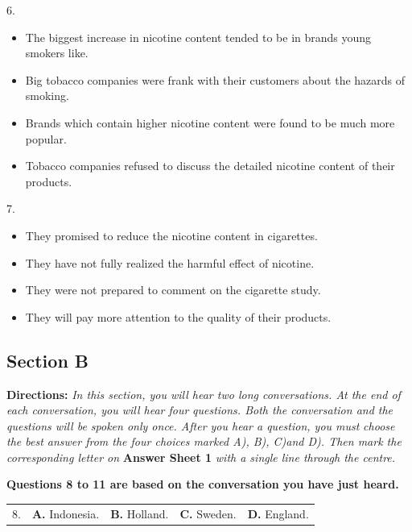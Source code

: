 \documentclass[UTF8,11pt]{ctexart}
\begin{document}
6.


\begin{itemize}[leftmargin=2em,itemsep=.2em,topsep=.4em]\item[A.] The biggest increase in nicotine content tended to be in brands young smokers like.
\item[B.] Big tobacco companies were frank with their customers about the hazards of smoking.
\item[C.] Brands which contain higher nicotine content were found to be much more popular.
\item[D.] Tobacco companies refused to discuss the detailed nicotine content of their products.
\end{itemize}

7.


\begin{itemize}[leftmargin=2em,itemsep=.2em,topsep=.4em]\item[A.] They promised to reduce the nicotine content in cigarettes.
\item[B.] They have not fully realized the harmful effect of nicotine.
\item[C.] They were not prepared to comment on the cigarette study.
\end{itemize}

\begin{itemize}[leftmargin=2em,itemsep=.2em,topsep=.4em]\item[D.] They will pay more attention to the quality of their products.
\end{itemize}

\subsection*{\textbf{Section B}}


\textbf{Directions:}\textit{ In this section, you will hear two long conversations. At the end of each conversation, you will hear four} \textit{questions. Both the conversation and the questions will be spoken only once. After you hear a question, you must} \textit{choose the best answer from the four choices marked A), B), C)and D). Then mark the corresponding letter on} \textbf{Answer Sheet 1}\textit{ with a single line through the centre.}


\textbf{Questions 8 to 11 are based on the conversation you have just heard.}


\noindent\begin{tabularx}{\linewidth}{@{}lXXXX@{}}8. & \textbf{A.} Indonesia. & \textbf{B.} Holland. & \textbf{C.} Sweden. & \textbf{D.} England.\\\end{tabularx}\par
\end{document}
